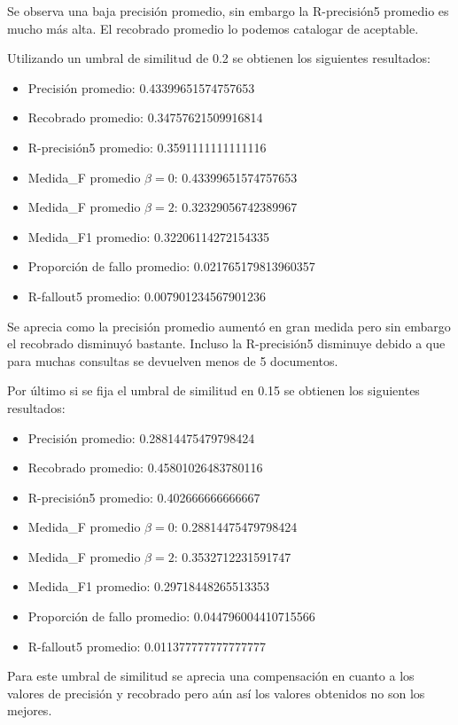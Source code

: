 \documentclass[runningheads]{llncs}
\begin{document}
Se observa una baja precisi\'on promedio, sin embargo la R-precisi\'on5 promedio es mucho m\'as alta. El recobrado promedio lo podemos catalogar de aceptable.

Utilizando un umbral de similitud de 0.2 se obtienen los siguientes resultados:

\begin{itemize}
\item Precisi\'on promedio:  0.43399651574757653
\item Recobrado promedio:   0.34757621509916814
\item R-precisi\'on5 promedio:  0.3591111111111116
\item Medida\_F promedio  $ \beta=0 $:  0.43399651574757653 
\item Medida\_F promedio  $ \beta=2 $:  0.32329056742389967
\item Medida\_F1 promedio:    0.32206114272154335
\item Proporci\'on de fallo promedio: 0.021765179813960357
\item R-fallout5 promedio: 0.007901234567901236 
\end{itemize}

Se aprecia como la precisi\'on promedio aument\'o en gran medida pero sin embargo el recobrado disminuy\'o bastante. Incluso la R-precisi\'on5 disminuye debido a que para muchas consultas se devuelven menos de 5 documentos.

Por \'ultimo si se fija el umbral de similitud en 0.15 se obtienen los siguientes resultados:

\begin{itemize}
	\item Precisi\'on promedio:   0.28814475479798424
	\item Recobrado promedio:  0.45801026483780116
	\item R-precisi\'on5 promedio:  0.402666666666667
	\item Medida\_F promedio  $ \beta=0 $:   0.28814475479798424
	\item Medida\_F promedio  $ \beta=2 $:  0.3532712231591747
	\item Medida\_F1 promedio:     0.29718448265513353
	\item Proporci\'on de fallo promedio: 0.044796004410715566
	\item R-fallout5 promedio:  0.011377777777777777 
\end{itemize}

Para este umbral de similitud se aprecia una compensaci\'on en cuanto a los valores de precisi\'on y recobrado pero a\'un as\'i los valores obtenidos no son los mejores.
\end{document}
